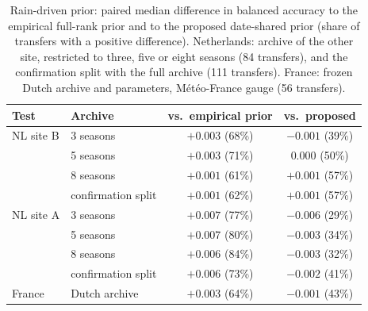 \begin{table}[!t]
\caption{Rain-driven prior: paired median difference in balanced accuracy to the empirical full-rank prior and to the proposed date-shared prior (share of transfers with a positive difference). Netherlands: archive of the other site, restricted to three, five or eight seasons (84 transfers), and the confirmation split with the full archive (111 transfers). France: frozen Dutch archive and parameters, Météo-France gauge (56 transfers).}
\label{tab:rain}
\centering\footnotesize
\setlength{\tabcolsep}{3pt}
\begin{tabular}{@{}llcc@{}}
\toprule
Test & Archive & vs.\ empirical prior & vs.\ proposed\\
\midrule
NL site B & 3 seasons & $+0.003$ (68\%) & $-0.001$ (39\%)\\
 & 5 seasons & $+0.003$ (71\%) & $0.000$ (50\%)\\
 & 8 seasons & $+0.001$ (61\%) & $+0.001$ (57\%)\\
 & confirmation split & $+0.001$ (62\%) & $+0.001$ (57\%)\\
\midrule
NL site A & 3 seasons & $+0.007$ (77\%) & $-0.006$ (29\%)\\
 & 5 seasons & $+0.007$ (80\%) & $-0.003$ (34\%)\\
 & 8 seasons & $+0.006$ (84\%) & $-0.003$ (32\%)\\
 & confirmation split & $+0.006$ (73\%) & $-0.002$ (41\%)\\
\midrule
France & Dutch archive & $+0.003$ (64\%) & $-0.001$ (43\%)\\
\bottomrule
\end{tabular}
\end{table}
